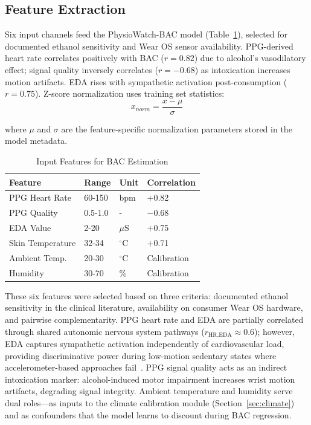 \documentclass[HARVARD,Times2COL]{WileyNJDv5}
\begin{document}
\subsection{Feature Extraction}
Six input channels feed the PhysioWatch-BAC model (Table~\ref{tab:features}), selected for documented ethanol sensitivity and Wear OS sensor availability. PPG-derived heart rate correlates positively with BAC ($r=0.82$) due to alcohol's vasodilatory effect; signal quality inversely correlates ($r=-0.68$) as intoxication increases motion artifacts. EDA rises with sympathetic activation post-consumption ($r=0.75$). Z-score normalization uses training set statistics: \begin{equation}
x_{norm} = \frac{x - \mu}{\sigma}
\end{equation}

where $\mu$ and $\sigma$ are the feature-specific normalization parameters stored in the model metadata.

\begin{table}[htbp]
\caption{Input Features for BAC Estimation}
\label{tab:features}
\centering
\small
\begin{tabular}{@{}llll@{}}
\toprule
\textbf{Feature} & \textbf{Range} & \textbf{Unit} & \textbf{Correlation} \\
\midrule
PPG Heart Rate & 60-150 & bpm & $+$0.82 \\
PPG Quality & 0.5-1.0 & - & $-$0.68 \\
EDA Value & 2-20 & $\mu$S & $+$0.75 \\
Skin Temperature & 32-34 & $^\circ$C & $+$0.71 \\
Ambient Temp. & 20-30 & $^\circ$C & Calibration \\
Humidity & 30-70 & \% & Calibration \\
\bottomrule
\end{tabular}
\end{table}

These six features were selected based on three criteria: documented ethanol sensitivity in the clinical literature, availability on consumer Wear OS hardware, and pairwise complementarity. PPG heart rate and EDA are partially correlated through shared autonomic nervous system pathways ($r_{\text{HR,EDA}} \approx 0.6$); however, EDA captures sympathetic activation independently of cardiovascular load, providing discriminative power during low-motion sedentary states where accelerometer-based approaches fail~\citep{mejia2024}. PPG signal quality acts as an indirect intoxication marker: alcohol-induced motor impairment increases wrist motion artifacts, degrading signal integrity. Ambient temperature and humidity serve dual roles---as inputs to the climate calibration module (Section~\ref{sec:climate}) and as confounders that the model learns to discount during BAC regression.
\end{document}
